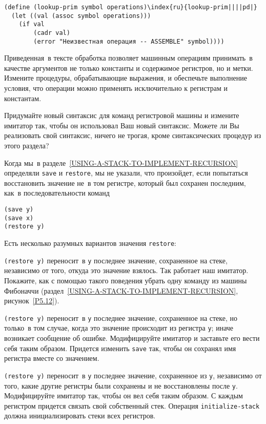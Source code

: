 \begin{Verbatim}[fontsize=\small]
(define (lookup-prim symbol operations)\index{ru}{lookup-prim||||pd|}
  (let ((val (assoc symbol operations)))
    (if val
        (cadr val)
        (error "Неизвестная операция -- ASSEMBLE" symbol))))
\end{Verbatim}
\begin{exercise}{5.9}%
\label{EX5.9}%
Приведенная~в тексте обработка позволяет машинным
операциям принимать~в качестве аргументов не только константы и
содержимое регистров, но и метки.  Измените процедуры, обрабатывающие
выражения, и обеспечьте выполнение условия, что операции можно
применять исключительно к регистрам и константам.
\end{exercise}
\begin{exercise}{5.10}%
\label{EX5.10}%
Придумайте новый синтаксис для команд регистровой машины
и измените имитатор так, чтобы он использовал Ваш новый синтаксис.
Можете ли Вы реализовать свой синтаксис, ничего не трогая, кроме
синтаксических процедур из этого раздела?
\end{exercise}
\begin{exercise}{5.11}%
\label{EX5.11}%
Когда мы~в 
разделе~\ref{USING-A-STACK-TO-IMPLEMENT-RECURSION} определяли
{\tt save} и {\tt restore}, мы не указали, что
произойдет, если попытаться восстановить значение не~в том регистре,
который был сохранен последним, как~в последовательности команд

\begin{Verbatim}[fontsize=\small]
(save y)
(save x)
(restore y)
\end{Verbatim}
Есть несколько разумных вариантов значения {\tt restore}:

\begin{plainenum}

\item
{\tt (restore y)} переносит~в {\tt y}
последнее значение, сохраненное на стеке, независимо от того, откуда
это значение взялось.  Так работает наш имитатор.  Покажите, как с
помощью такого поведения убрать одну команду из машины Фибоначчи
(раздел~\ref{USING-A-STACK-TO-IMPLEMENT-RECURSION},
рисунок~\ref{P5.12}).

\item
{\tt (restore y)} переносит~в {\tt y}
последнее значение, сохраненное на стеке, но только~в том случае,
когда это значение происходит из регистра {\tt y}; иначе
возникает сообщение об ошибке.  Модифицируйте имитатор и заставьте его
вести себя таким образом.  Придется изменить  {\tt save} так,
чтобы он сохранял имя регистра вместе со значением.

\item
{\tt (restore y)} переносит~в {\tt y}
последнее значение, сохраненное из {\tt y}, независимо от
того, какие другие регистры были сохранены и не восстановлены после
{\tt y}. Модифицируйте имитатор так, чтобы он вел себя таким
образом.  С каждым регистром придется связать свой собственный стек.
Операция {\tt initialize-stack} должна инициализировать стеки
всех регистров.
\end{plainenum}
\end{exercise}
